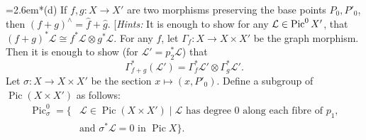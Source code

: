 {\noindent\hangindent=2.6em\hspace*{1.1em}*(d) If $f,g\colon X\to X'$ are two morphisms preserving the base points $P_0,P'_0$, then $(f+g)^\wedge=\widehat f+\widehat g$. [\emph{Hints:} It is enough to show for any $\mathcal L\in\operatorname{Pic}^{0}X'$, that $(f+g)^*\mathcal L\cong f^*\mathcal L\otimes g^*\mathcal L$. For any $f$, let $\Gamma_f\colon X\to X\times X'$ be the graph morphism. Then it is enough to show (for $\mathcal L'=p_2^*\mathcal L$) that
\[
\Gamma_{f+g}^*(\mathcal L')=\Gamma_f^*\mathcal L'\otimes\Gamma_g^*\mathcal L'.
\]
Let $\sigma\colon X\to X\times X'$ be the section $x\mapsto(x,P'_0)$. Define a subgroup of $\operatorname{Pic}(X\times X')$ as follows:
\[
\begin{aligned}
\operatorname{Pic}_\sigma^0=\{&\mathcal L\in\operatorname{Pic}(X\times X')\mid
  \mathcal L\text{ has degree }0\text{ along each fibre of }p_1,\\
 &\text{and }\sigma^*\mathcal L=0\text{ in }\operatorname{Pic}X\}.
\end{aligned}
\]}
